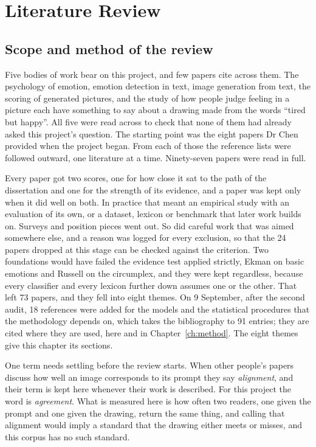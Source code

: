 \chapter{Literature Review}
\label{ch:lit}

\section{Scope and method of the review}
\label{sec:lit-scope}

Five bodies of work bear on this project, and few papers cite across them. The psychology of emotion, emotion detection in text, image generation from text, the scoring of generated pictures, and the study of how people judge feeling in a picture each have something to say about a drawing made from the words ``tired but happy''. All five were read across to check that none of them had already asked this project's question. The starting point was the eight papers Dr Chen provided when the project began. From each of those the reference lists were followed outward, one literature at a time. Ninety-seven papers were read in full.

Every paper got two scores, one for how close it sat to the path of the dissertation and one for the strength of its evidence, and a paper was kept only when it did well on both. In practice that meant an empirical study with an evaluation of its own, or a dataset, lexicon or benchmark that later work builds on. Surveys and position pieces went out. So did careful work that was aimed somewhere else, and a reason was logged for every exclusion, so that the 24 papers dropped at this stage can be checked against the criterion. Two foundations would have failed the evidence test applied strictly, Ekman on basic emotions and Russell on the circumplex, and they were kept regardless, because every classifier and every lexicon further down assumes one or the other. That left 73 papers, and they fell into eight themes. On 9 September, after the second audit, 18 references were added for the models and the statistical procedures that the methodology depends on, which takes the bibliography to 91 entries; they are cited where they are used, here and in Chapter~\ref{ch:method}. The eight themes give this chapter its sections.

One term needs settling before the review starts. When other people's papers discuss how well an image corresponds to its prompt they say \emph{alignment}, and their term is kept here whenever their work is described. For this project the word is \emph{agreement}. What is measured here is how often two readers, one given the prompt and one given the drawing, return the same thing, and calling that alignment would imply a standard that the drawing either meets or misses, and this corpus has no such standard.

